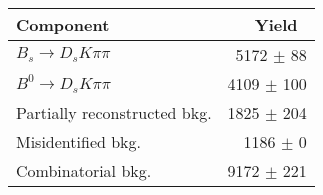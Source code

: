 \begin{tabular}{l r }
\hline\hline
Component & Yield\ \\
\hline
$B_s \to D_s K \pi \pi$ & 5172 $\pm$ 88 \\
$B^{0} \to D_s K \pi \pi$ & 4109 $\pm$ 100 \\
Partially reconstructed bkg. & 1825 $\pm$ 204 \\
Misidentified bkg. & 1186 $\pm$ 0 \\
Combinatorial bkg. & 9172 $\pm$ 221 \\
\hline\hline
\end{tabular}
\label{table:signalYields}
